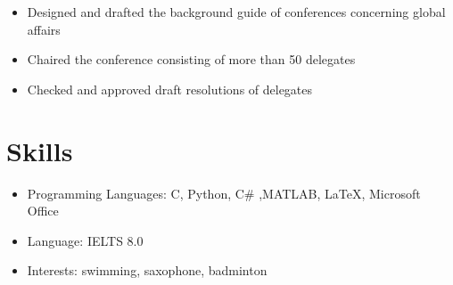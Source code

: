 \documentclass{resume}
\begin{document}

\begin{itemize}
  \item Designed and drafted the background guide of conferences concerning global affairs
  \item Chaired the conference consisting of more than 50 delegates
  \item Checked and approved draft resolutions of delegates
\end{itemize}


\section{Skills}
\begin{itemize}[parsep=0.5ex]
  \item Programming Languages: C, Python, C\# ,MATLAB, \LaTeX, Microsoft Office
  \item Language: IELTS 8.0
  \item Interests: swimming, saxophone, badminton %
\end{itemize}
\end{document}

